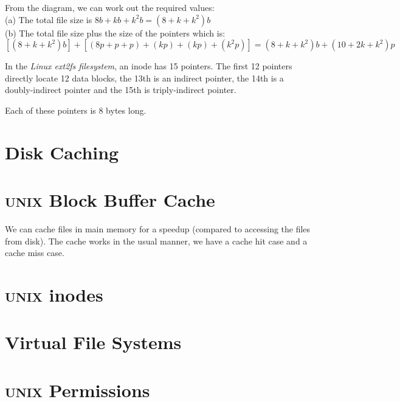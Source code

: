 From the diagram, we can work out the required values:\\
(a) The total file size is $8b + kb + k^2b = (8+k+k^2)b$ \\
(b) The total file size plus the size of the pointers which is:
$[(8+k+k^2)b] + [(8p + p + p) + (kp) + (kp) + (k^2p)] = (8+k+k^2)b + (10+2k+k^2)p$










\begin{example}
In the \textit{Linux ext2fs filesystem}, an inode has 15 pointers.
The first 12 pointers directly locate 12 data blocks, 
the 13th is an indirect pointer, the 14th is a doubly-indirect pointer and the 
15th is triply-indirect pointer. 

Each of these pointers is 8 bytes long.

\end{example}


\section{Disk Caching}



\section{\textsc{unix} Block Buffer Cache}

We can cache files in main memory for a speedup (compared to accessing the files 
from disk). The cache works in the usual manner, we have a cache hit case and a 
cache miss case.



\section{\textsc{unix} inodes}




\section{Virtual File Systems}


\section{\textsc{unix} Permissions}




